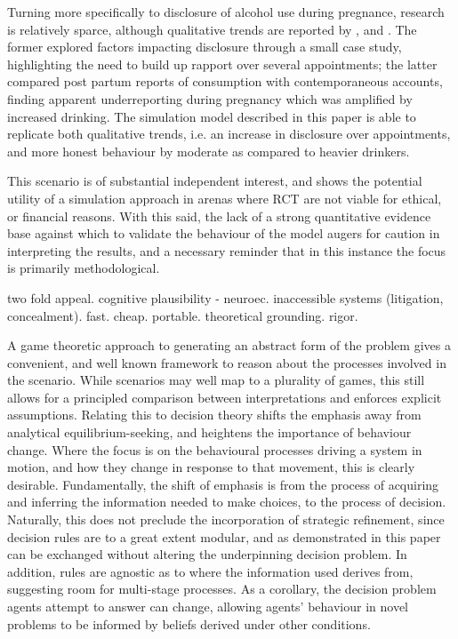 Turning more specifically to disclosure of alcohol use during pregnance, research is relatively sparce, although qualitative trends are reported by \citet{Phillips2007}, and \citet{Alvik2006}. The former explored factors impacting disclosure through a small case study, highlighting the need to build up rapport over several appointments; the latter compared post partum reports of consumption with contemporaneous accounts, finding apparent underreporting during pregnancy which was amplified by increased drinking. The simulation model described in this paper is able to replicate both qualitative trends, i.e. an increase in disclosure over appointments, and more honest behaviour by moderate as compared to heavier drinkers.

This scenario is of substantial independent interest, and shows the potential utility of a simulation approach in arenas where \ac{RCT} are not viable for ethical, or financial reasons. With this said, the lack of a strong quantitative evidence base against which to validate the behaviour of the model augers for caution in interpreting the results, and a necessary reminder that in this instance the focus is primarily methodological.

two fold appeal. cognitive plausibility - neuroec. inaccessible systems (litigation, concealment). fast. cheap. portable. theoretical grounding. rigor.

A game theoretic approach to generating an abstract form of the problem gives a convenient, and well known framework to reason about the processes involved in the scenario. While scenarios may well map to a plurality of games, this still allows for a principled comparison between interpretations and enforces explicit assumptions. Relating this to decision theory shifts the emphasis away from analytical equilibrium-seeking, and heightens the importance of behaviour change. Where the focus is on the behavioural processes driving a system in motion, and how they change in response to that movement, this is clearly desirable.
Fundamentally, the shift of emphasis is from the process of acquiring and inferring the information needed to make choices, to the process of decision.
Naturally, this does not preclude the incorporation of strategic refinement, since decision rules are to a great extent modular, and as demonstrated in this paper can be exchanged without altering the underpinning decision problem. In addition, rules are agnostic as to where the information used derives from, suggesting room for multi-stage processes.  As a corollary, the decision problem agents attempt to answer can change, allowing agents' behaviour in novel problems to be informed by beliefs derived under other conditions. 


